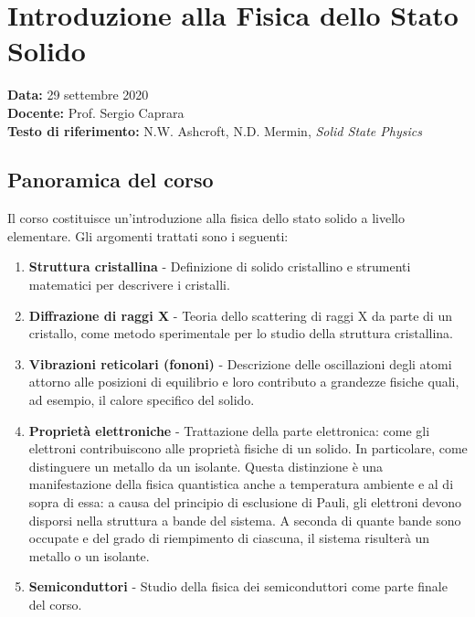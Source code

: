 \chapter{Introduzione alla Fisica dello Stato Solido}

\begin{nota}
\textbf{Data:} 29 settembre 2020\\
\textbf{Docente:} Prof. Sergio Caprara\\
\textbf{Testo di riferimento:} N.W. Ashcroft, N.D. Mermin, \textit{Solid State Physics}\\
\end{nota}

\vspace{0.5cm}

\section{Panoramica del corso}

Il corso costituisce un'introduzione alla fisica dello stato solido a livello elementare. Gli argomenti trattati sono i seguenti:

\begin{enumerate}
    \item \textbf{Struttura cristallina} - Definizione di solido cristallino e strumenti matematici per descrivere i cristalli.
    \item \textbf{Diffrazione di raggi X} - Teoria dello scattering di raggi X da parte di un cristallo, come metodo sperimentale per lo studio della struttura cristallina.
    \item \textbf{Vibrazioni reticolari (fononi)} - Descrizione delle oscillazioni degli atomi attorno alle posizioni di equilibrio e loro contributo a grandezze fisiche quali, ad esempio, il calore specifico del solido.
    \item \textbf{Proprietà elettroniche} - Trattazione della parte elettronica: come gli elettroni contribuiscono alle proprietà fisiche di un solido. In particolare, come distinguere un metallo da un isolante. Questa distinzione è una manifestazione della fisica quantistica anche a temperatura ambiente e al di sopra di essa: a causa del principio di esclusione di Pauli, gli elettroni devono disporsi nella struttura a bande del sistema. A seconda di quante bande sono occupate e del grado di riempimento di ciascuna, il sistema risulterà un metallo o un isolante.
    \item \textbf{Semiconduttori} - Studio della fisica dei semiconduttori come parte finale del corso.
\end{enumerate}

